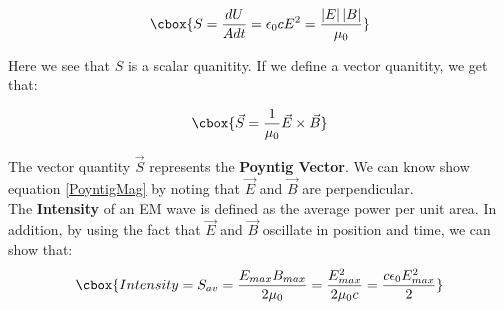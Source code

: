 \documentclass{hw}
\numberwithin{equation}{section}
\begin{document}
\begin{equation}
\cbox{%
  \label{eq::PoyntigMag}
  S = \frac{dU}{Adt} = \epsilon_0 cE^2 = \frac{\left|E\right| \left|B\right|}{\mu_0}
}
\end{equation}

Here we see that $S$ is a scalar quanitity. If we define a vector quanitity, we
get that:

\begin{equation}
\cbox{%
  \vec{S} = \frac{1}{\mu_0} \vec{E} \times \vec{B}
}
\end{equation}

The vector quantity $\vec{S}$ represents the \textbf{Poyntig Vector}. We can
know show equation \ref{PoyntigMag} by noting that $\vec{E}$ and $\vec{B}$ are
perpendicular. \\

The \textbf{Intensity} of an EM wave is defined as the average power per unit
area. In addition, by using the fact that $\vec{E}$ and $\vec{B}$ oscillate in
position and time, we can show that: 
\begin{equation}
\cbox{%
  Intensity = S_{av} = \frac{E_{max} B_{max}}{2\mu_0} = \frac{E_{max}^2}{2\mu_0
  c} = \frac{c\epsilon_0 E_{max}^2}{2}
}
\end{equation}



\end{document}
